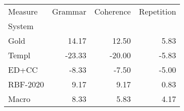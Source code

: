 \begin{tabular}{lrrr}
\toprule
Measure & Grammar & Coherence & Repetition \\
System &  &  &  \\
\midrule
Gold & 14.17 & 12.50 & 5.83 \\
Templ & -23.33 & -20.00 & -5.83 \\
ED+CC & -8.33 & -7.50 & -5.00 \\
RBF-2020 & 9.17 & 9.17 & 0.83 \\
Macro & 8.33 & 5.83 & 4.17 \\
\bottomrule
\end{tabular}
